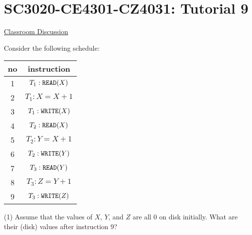 


\usepackage{amsfonts, amsmath, amssymb, amsthm}
\usepackage{comment}
\usepackage{graphicx}
\usepackage{ifthen}
\usepackage{latexsym}
\usepackage[normalem]{ulem}



\def\extraspacing{\vspace{5mm} \noindent}

\def\best{\mathit{best}}
\def\size{\mathit{size}}




\section*{SC3020-CE4301-CZ4031: Tutorial 9}

\begin{center}
    \uline{Classroom Discussion}
\end{center}

\extraspacing {\bf Problem 1.} Consider the following schedule:

\begin{center}
    \begin{tabular}{c|c}
        no & instruction \\
        \hline
        1 & $T_1: \texttt{READ}(X)$ \\
        2 & $T_1: X = X + 1$ \\
        3 & $T_1: \texttt{WRITE}(X)$ \\
        4 & $T_2: \texttt{READ}(X)$ \\
        5 & $T_2: Y = X + 1$ \\
        6 & $T_2: \texttt{WRITE}(Y)$ \\
        7 & $T_3: \texttt{READ}(Y)$ \\
        8 & $T_3: Z = Y + 1$ \\
        9 & $T_3: \texttt{WRITE}(Z)$
    \end{tabular}
\end{center}

(1) Assume that the values of $X$, $Y$, and $Z$ are all 0 on disk initially. What are their (disk) values after instruction 9?


